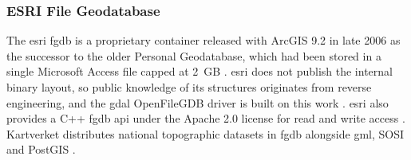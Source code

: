 



\subsubsection{ESRI File Geodatabase}
\label{background:spatial-data-formats-and-storage-models:file-databases:esri-file-geodatabase}
The \acrfull{esri} \acrfull{fgdb} is a proprietary container released with ArcGIS 9.2 in late 2006 as the successor to the older Personal Geodatabase, which had been stored in a single Microsoft Access file capped at 2~GB \parencite{esri2024_its_not_personal}. \acrshort{esri} does not publish the internal binary layout, so public knowledge of its structures originates from reverse engineering, and the \acrshort{gdal} OpenFileGDB driver is built on this work \parencite{rouault2013_filegdb_format_specification, gdal2025_openfilegdb_driver}. \acrshort{esri} also provides a C++ \acrshort{fgdb} \acrshort{api} under the Apache 2.0 license for read and write access \parencite{esri2024_file_geodatabase_api}. Kartverket distributes national topographic datasets in \acrshort{fgdb} alongside \acrshort{gml}, SOSI and PostGIS \parencite{kartverket2026_geonorge_kartkatalogen}.

